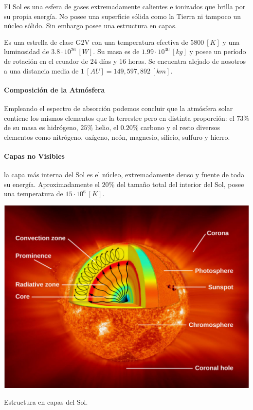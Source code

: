 \documentclass{tufte-handout}
\begin{document}
El Sol es una esfera de gases extremadamente calientes e ionizados que brilla por su propia energía. No posee una superficie sólida como la Tierra ni tampoco un núcleo sólido. Sin embargo posee una estructura en capas.


Es una estrella de clase G2V con una temperatura efectiva de $5800~[K]$ y una luminosidad de $3.8\cdot 10^{26}~[W]$. Su masa es de $1.99 \cdot 10^{30}~[kg]$ y posee un período de rotación en el ecuador de $24$ días y $16$ horas. Se encuentra alejado de nosotros a una distancia media de $1~[AU] = 149,597,892~[km]$.

\paragraph{Composición de la Atmósfera}

Empleando el espectro de absorción podemos concluir que la atmósfera solar contiene los mismos elementos que la terrestre pero en distinta proporción: el $73\%$ de su masa es hidrógeno, $25\%$ helio, el $0.20\%$ carbono y el resto diversos elementos como nitrógeno, oxígeno, neón, magnesio, silicio, sulfuro y hierro.

\paragraph{Capas no Visibles} la capa más interna del Sol es el núcleo, extremadamente denso y fuente de toda su energía. Aproximadamente el $20\%$ del tamaño total del interior del Sol, posee una temperatura de $15\cdot 10^6~[K]$.

\begin{marginfigure}
  \includegraphics[width=\linewidth]{img/sun}
  \caption{Estructura en capas del Sol.}
\end{marginfigure}
\end{document}
